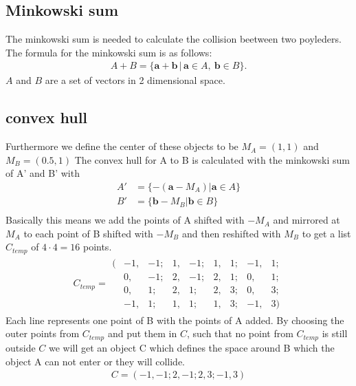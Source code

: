 \subsection{Minkowski sum}
The minkowski sum is needed to calculate the collision beetween two poyleders. The formula for the minkowski sum is as follows:
\begin{align*}
 A + B = \{\mathbf{a}+\mathbf{b}\,|\,\mathbf{a}\in A,\ \mathbf{b}\in B\}. 
\end{align*}
$A$ and $B$ are a set of vectors in 2 dimensional space. 

\subsection{convex hull} %
Furthermore we define the center of these objects to be $M_A = (1,1)$ and $M_B = (0.5 , 1)$
The convex hull for A to B is calculated with the minkowski sum of A' and B' with
\begin{align*}
A'  &= \{ -(\mathbf{a} - M_A) |\mathbf{a} \in A \}\\
B'  &= \{ \mathbf{b} - M_B |\mathbf{b} \in B \}\\
\end{align*}
Basically this means we add the points of A shifted with $-M_A$ and mirrored at $M_A$ to each point of B shifted with $-M_B$ and then reshifted with $M_B$ to get a list $C_{temp}$ of $4\cdot 4 = 16$  points.
\begin{align*}
C_{temp} =	\begin{matrix}
		(&-1, &-1; &1, &-1; &1, &1; &-1, &1;\\
		&0, &-1; &2, &-1; &2, &1; &0, &1;\\
		&0, &1; &2, &1; &2, &3; &0, &3;\\
		&-1, &1; &1, &1; &1, &3; &-1, &3)
		\end{matrix}
\end{align*}
Each line represents one point of B with the points of A added. By choosing the outer points from $C_{temp}$ and put them in $C$, such that no point from $C_{temp}$ is still outside $C$  we will get an object C which defines the space around B which the object A can not enter or they will collide.
\begin{align*}
C = (-1,-1; 2, -1; 2 ,3; -1, 3)
\end{align*}

